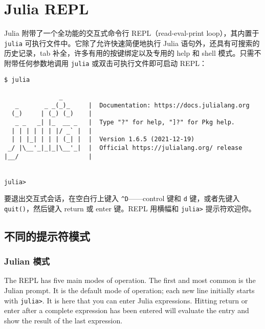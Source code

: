 \hypertarget{2176533558823998019}{}


\chapter{Julia REPL}



Julia 附带了一个全功能的交互式命令行 REPL（read-eval-print loop），其内置于 \texttt{julia} 可执行文件中。它除了允许快速简便地执行 Julia 语句外，还具有可搜索的历史记录，tab 补全，许多有用的按键绑定以及专用的 help 和 shell 模式。只需不附带任何参数地调用 \texttt{julia} 或双击可执行文件即可启动 REPL：




\begin{lstlisting}
$ julia

               _
   _       _ _(_)_     |  Documentation: https://docs.julialang.org
  (_)     | (_) (_)    |
   _ _   _| |_  __ _   |  Type "?" for help, "]?" for Pkg help.
  | | | | | | |/ _` |  |
  | | |_| | | | (_| |  |  Version 1.6.5 (2021-12-19)
 _/ |\__'_|_|_|\__'_|  |  Official https://julialang.org/ release
|__/                   |


julia>
\end{lstlisting}



要退出交互式会话，在空白行上键入 \texttt{{\textasciicircum}D}——control 键和 \texttt{d} 键，或者先键入 \texttt{quit()}，然后键入 return 或 enter 键。REPL 用横幅和 \texttt{julia>} 提示符欢迎你。



\hypertarget{13843805802306265376}{}


\section{不同的提示符模式}



\hypertarget{2631446594844418165}{}


\subsection{Julian 模式}



The REPL has five main modes of operation. The first and most common is the Julian prompt. It is the default mode of operation; each new line initially starts with \texttt{julia>}. It is here that you can enter Julia expressions. Hitting return or enter after a complete expression has been entered will evaluate the entry and show the result of the last expression.




